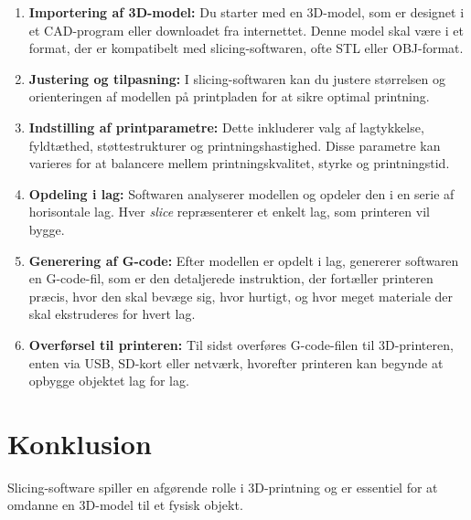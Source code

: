 \documentclass{article}
\begin{document}
\begin{enumerate}
    \item \textbf{Importering af 3D-model:} Du starter med en 3D-model, som er designet i et CAD-program eller downloadet fra internettet. Denne model skal være i et format, der er kompatibelt med slicing-softwaren, ofte STL eller OBJ-format.
    \item \textbf{Justering og tilpasning:} I slicing-softwaren kan du justere størrelsen og orienteringen af modellen på printpladen for at sikre optimal printning.
    \item \textbf{Indstilling af printparametre:} Dette inkluderer valg af lagtykkelse, fyldtæthed, støttestrukturer og printningshastighed. Disse parametre kan varieres for at balancere mellem printningskvalitet, styrke og printningstid.
    \item \textbf{Opdeling i lag:} Softwaren analyserer modellen og opdeler den i en serie af horisontale lag. Hver \textit{slice} repræsenterer et enkelt lag, som printeren vil bygge.
    \item \textbf{Generering af G-code:} Efter modellen er opdelt i lag, genererer softwaren en G-code-fil, som er den detaljerede instruktion, der fortæller printeren præcis, hvor den skal bevæge sig, hvor hurtigt, og hvor meget materiale der skal ekstruderes for hvert lag.
    \item \textbf{Overførsel til printeren:} Til sidst overføres G-code-filen til 3D-printeren, enten via USB, SD-kort eller netværk, hvorefter printeren kan begynde at opbygge objektet lag for lag.
\end{enumerate}

\section*{Konklusion}

Slicing-software spiller en afgørende rolle i 3D-printning og er essentiel for at omdanne en 3D-model til et fysisk objekt.
\end{document}
